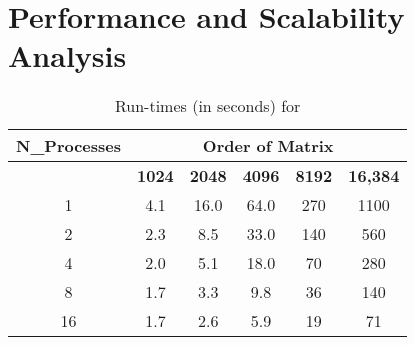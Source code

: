 \section{Performance and Scalability Analysis}

\begin{table}[h!]
    \centering
    \label{tab:matrix_vector_times}
    \renewcommand{\arraystretch}{1.2}
    \begin{tabular}{|c|c|c|c|c|c|}
    \hline
    \textbf{N\_Processes} & \multicolumn{5}{c|}{\textbf{Order of Matrix}} \\ \hline
    & \textbf{1024} & \textbf{2048} & \textbf{4096} & \textbf{8192} & \textbf{16,384} \\ \hline
    1  & 4.1 & 16.0 & 64.0 & 270 & 1100 \\ \hline
    2  & 2.3 & 8.5  & 33.0 & 140 & 560  \\ \hline
    4  & 2.0 & 5.1  & 18.0 & 70  & 280  \\ \hline
    8  & 1.7 & 3.3  & 9.8  & 36  & 140  \\ \hline
    16 & 1.7 & 2.6  & 5.9  & 19  & 71   \\ \hline
    \end{tabular}
    \caption{Run-times (in seconds) for}
    \vspace{0.5em}
\end{table}

    
